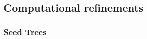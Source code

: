 \documentclass[11pt,letterpaper]{article}
\theoremstyle{definition}
\newcommand{\6}{\mathbf}
\newcommand{\7}{\mathcal}
\begin{document}





\subsection{Computational refinements}






\subsubsection{Seed Trees}
\end{document}

